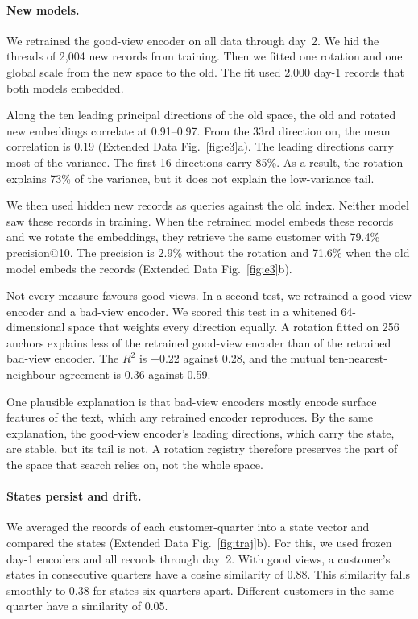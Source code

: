 \documentclass[11pt]{article}
\begin{document}
\paragraph{New models.} We retrained the good-view encoder on all data through day~2. We hid the threads of 2{,}004 new records from training. Then we fitted one rotation and one global scale from the new space to the old. The fit used 2{,}000 day-1 records that both models embedded.

Along the ten leading principal directions of the old space, the old and rotated new embeddings correlate at 0.91--0.97. From the 33rd direction on, the mean correlation is 0.19 (Extended Data Fig.~\ref{fig:e3}a). The leading directions carry most of the variance. The first 16 directions carry 85\%. As a result, the rotation explains 73\% of the variance, but it does not explain the low-variance tail.

We then used hidden new records as queries against the old index. Neither model saw these records in training. When the retrained model embeds these records and we rotate the embeddings, they retrieve the same customer with 79.4\% precision@10. The precision is 2.9\% without the rotation and 71.6\% when the old model embeds the records (Extended Data Fig.~\ref{fig:e3}b).

Not every measure favours good views. In a second test, we retrained a good-view encoder and a bad-view encoder. We scored this test in a whitened 64-dimensional space that weights every direction equally. A rotation fitted on 256 anchors explains less of the retrained good-view encoder than of the retrained bad-view encoder. The $R^2$ is $-0.22$ against $0.28$, and the mutual ten-nearest-neighbour agreement is 0.36 against 0.59.

One plausible explanation is that bad-view encoders mostly encode surface features of the text, which any retrained encoder reproduces. By the same explanation, the good-view encoder's leading directions, which carry the state, are stable, but its tail is not. A rotation registry therefore preserves the part of the space that search relies on, not the whole space.

\paragraph{States persist and drift.} We averaged the records of each customer-quarter into a state vector and compared the states (Extended Data Fig.~\ref{fig:traj}b). For this, we used frozen day-1 encoders and all records through day~2. With good views, a customer's states in consecutive quarters have a cosine similarity of 0.88. This similarity falls smoothly to 0.38 for states six quarters apart. Different customers in the same quarter have a similarity of 0.05.
\end{document}
